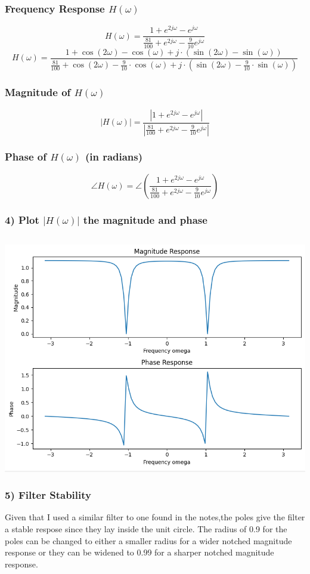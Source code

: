 \documentclass[12pt,letterpaper]{article}
\begin{document}
\subsubsection*{Frequency Response $H(\omega)$}
\[
H(\omega) = \frac{1 + e^{2j\omega} - e^{j\omega}}{\frac{81}{100} + e^{2j\omega} - \frac{9}{10}e^{j\omega}}
\]
\[
H(\omega) = \frac{1 + \cos(2\omega) - \cos(\omega) + j \cdot (\sin(2\omega) - \sin(\omega))}{
\frac{81}{100} + \cos(2\omega) - \frac{9}{10} \cdot \cos(\omega) + j \cdot (\sin(2\omega) - \frac{9}{10} \cdot \sin(\omega))}
\]
\subsubsection*{Magnitude of $H(\omega)$}
\[
|H(\omega)| =  \frac{|1 + e^{2j\omega} - e^{j\omega}|}{|\frac{81}{100} + e^{2j\omega} - \frac{9}{10}e^{j\omega}|}
\]
\subsubsection*{Phase of $H(\omega)$ (in radians)}
\[
\angle H(\omega) = \angle  (\frac{1 + e^{2j\omega} - e^{j\omega}}{\frac{81}{100} + e^{2j\omega} - \frac{9}{10}e^{j\omega}})
\]
\newpage
\subsubsection*{4) Plot $|H(\omega)|$ the magnitude and phase}
\inputminted[frame=lines,framesep=2mm,baselinestretch=1.2,bgcolor=LightGray,breaklines,fontsize=\tiny,linenos]{python}{p1p3.py}
\includegraphics*[scale=0.5]{p1p3.png}
\newpage
\subsubsection*{5) Filter Stability}
Given that I used a similar filter to one found in the notes,the poles give the filter a stable respose since they lay inside the unit circle. The radius of 0.9 for the poles can be changed to either a smaller radius for a wider notched magnitude response or they can be widened to 0.99 for a sharper notched magnitude response.\\
\end{document}

